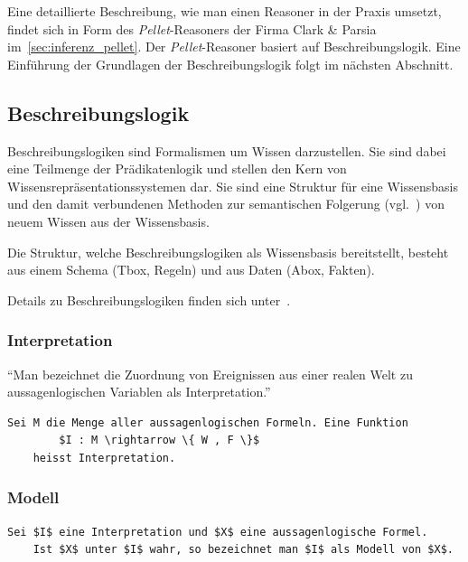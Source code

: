 Eine detaillierte Beschreibung, wie man einen Reasoner in der Praxis umsetzt, findet sich in Form des \textit{Pellet}-Reasoners der Firma Clark \& Parsia im~\autoref{sec:inferenz_pellet}. Der \textit{Pellet}-Reasoner basiert auf Beschreibungslogik.  Eine Einführung der Grundlagen der Beschreibungslogik folgt im nächsten Abschnitt.

\subsection{Beschreibungslogik}
\label{subsubsection:beschreibungslogik}
Beschreibungslogiken sind Formalismen um Wissen darzustellen. Sie sind dabei eine Teilmenge der Prädikatenlogik und stellen den Kern von Wissensrepräsentationssystemen dar.
Sie sind eine Struktur für eine Wissensbasis und den damit verbundenen Methoden zur semantischen Folgerung (vgl.~\cite{dl:baader2003}) von neuem Wissen aus der Wissensbasis.

Die Struktur, welche Beschreibungslogiken als Wissensbasis bereitstellt, besteht aus einem Schema (Tbox, Regeln) und aus Daten (Abox, Fakten).

Details zu Beschreibungslogiken finden sich unter~\cite{dl:baader2003}.

\subsubsection{Interpretation}
\label{subsubsection:beschreibungslogik_Interpretation}
``Man bezeichnet die Zuordnung von Ereignissen aus einer realen Welt zu aussagenlogischen Variablen als Interpretation.''~\cite[S. 36]{laemmel}

\begin{lstlisting}[caption={Definition einer Interpretation \protect\footnotemark}]
    Sei M die Menge aller aussagenlogischen Formeln. Eine Funktion
        $I : M \rightarrow \{ W , F \}$
    heisst Interpretation.
\end{lstlisting}

\subsubsection{Modell}
\label{subsubsection:beschreibungslogik_modell}
\begin{lstlisting}[caption={Definition Modell \protect\footnotemark}]
    Sei $I$ eine Interpretation und $X$ eine aussagenlogische Formel.
    Ist $X$ unter $I$ wahr, so bezeichnet man $I$ als Modell von $X$.
\end{lstlisting}

